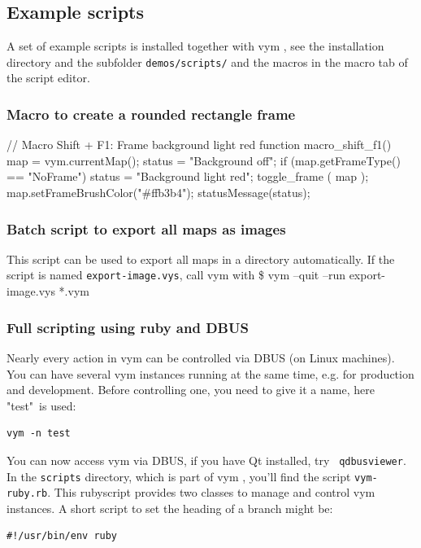 \documentclass[12pt,a4paper]{article}
\newcommand{\vym}{{\sc vym }}
\newenvironment{code}[1] { \verbatim #1}{\endverbatim  }
\begin{document}
\begin{appendix}
\subsection{Example scripts}  \label{examplescripts}
A set of example scripts is installed together with \vym, see the
installation directory and the subfolder {\tt demos/scripts/} and the
macros in the macro tab of the script editor.
\subsubsection{Macro to create a rounded rectangle frame}
\begin{code}
// Macro Shift + F1: Frame background light red
function macro_shift_f1()
{
    map = vym.currentMap();
    status = "Background off";
    if (map.getFrameType() == "NoFrame") {
        status = "Background light red";
    }
    toggle_frame ( map );
    map.setFrameBrushColor("#ffb3b4");
    statusMessage(status);
}
\end{code}

\subsubsection{Batch script to export all maps as images}
This script can be used to export all maps in a directory
automatically. If the script is named {\tt export-image.vys}, call \vym
with
\begin{code}
\$ vym --quit --run export-image.vys *.vym
\end{code}

\subsubsection{Full scripting using ruby and DBUS} \label{dbus}
Nearly every action in \vym can be controlled via DBUS (on Linux
machines). You can have several \vym instances running at the same time,
e.g. for production and development. Before controlling one, you need to
give it a name, here "test"\ is used:
\begin{verbatim}
vym -n test
\end{verbatim}
You can now access \vym via DBUS, if you have Qt installed, try {\tt
qdbusviewer}. In the {\tt scripts} directory, which is part of \vym,
you'll find the script {\tt vym-ruby.rb}. This rubyscript provides two
classes to manage and control \vym instances. A short script to set the
heading of a branch might be:
\begin{verbatim}
#!/usr/bin/env ruby


\end{verbatim}
\end{appendix}
\end{document}
